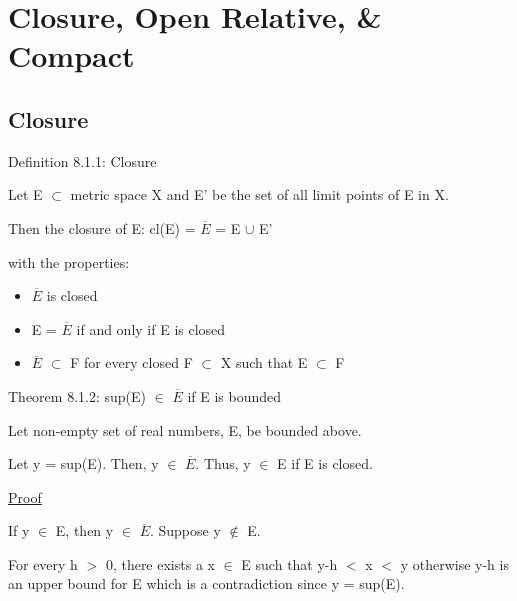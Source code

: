 \newpage
\section[Day 8: Closure, Open Relative, and Compact]
{Closure, Open Relative, \& Compact}

\subsection{ Closure }

{ \color{blue} Definition 8.1.1: Closure } 

	\begin{adjustbox}{minipage=14cm, right}
        Let E $\subset$ metric space X and E' be the set of all
        limit points of E in X.

        \qquad Then the closure of E:
            \qquad cl(E) = $\overline{E}$ = E $\cup$ E'

        with the properties:
	\end{adjustbox}

    \begin{itemize}[leftmargin=2cm, itemsep=0.4em]
        \item $\overline{E}$ is closed
        
        \item E = $\overline{E}$ if and only if E is closed
        
        \item $\overline{E}$ $\subset$ F for every closed F $\subset$ X
        such that E $\subset$ F \\
    \end{itemize}

{ \color{red} Theorem 8.1.2: sup(E) $\in$ $\overline{E}$ if E is bounded}

    \begin{adjustbox}{minipage=14cm, right}
        Let non-empty set of real numbers, E, be bounded above.
        
        Let y = sup(E). Then, y $\in$ $\overline{E}$.
        Thus, y $\in$ E if E is closed.
    \end{adjustbox}

{ \color{magenta} \underline{Proof} } 
	
	If y $\in$ E, then y $\in$ $\overline{E}$. Suppose y $\not \in$ E.

	For every h $>$ 0, there exists a x $\in$ E such that y-h $<$ x $<$ y
	otherwise y-h is an upper bound for E which is a contradiction
	since y = sup(E).


